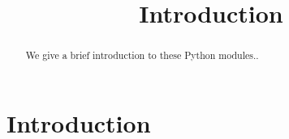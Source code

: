 \documentclass{ximera}
\title{Introduction}
\begin{document}
  
\begin{abstract}  
We give a brief introduction to these Python modules..
\end{abstract}  
\maketitle

\section{Introduction}
\end{document}
